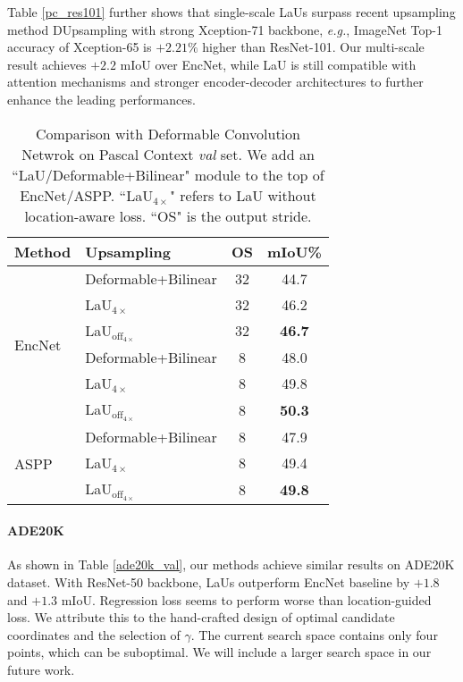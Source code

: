 \documentclass[10pt,twocolumn,letterpaper]{article}
\begin{document}
Table \ref{pc_res101} further shows that single-scale LaUs surpass recent upsampling method DUpsampling \cite{DUpsampling} with strong Xception-71 backbone, \textit{e.g.}, ImageNet Top-1 accuracy of Xception-65 is $+2.21\%$ higher than ResNet-101. Our multi-scale result achieves $+2.2$ mIoU over EncNet, while LaU is still compatible with attention mechanisms and stronger encoder-decoder architectures to further enhance the leading performances.
\begin{table}
  \caption{Comparison with Deformable Convolution Netwrok \cite{DaiQXLZHW17} on Pascal Context \textit{val} set. We add an ``LaU/Deformable+Bilinear" module to the top of EncNet/ASPP. ``LaU$_{4\times}$" refers to LaU without location-aware loss. ``OS" is the output stride.}
  \centering
\begin{tabular}{l|lcc}
\hline    
Method    & Upsampling & OS   & mIoU\%\\
\hline  \hline  
    \multirow{6}{*}{EncNet \cite{EncNet}}  & Deformable+Bilinear & 32  & 44.7 \\
    & LaU$_{4\times}$ & 32 & 46.2 \\
    & LaU$_{\text{off}_{4\times}}$ & 32 & \textbf{46.7} \\
\cline{2-4}  
& Deformable+Bilinear & 8  & 48.0  \\
& LaU$_{4\times}$ & 8 & 49.8 \\
    & LaU$_{\text{off}_{4\times}}$ & 8 & \textbf{50.3} \\
\hline
\multirow{3}{*}{ASPP \cite{ASPP}}  & Deformable+Bilinear & 8  & 47.9 \\
& LaU$_{4\times}$ & 8 & 49.4 \\
    & LaU$_{\text{off}_{4\times}}$ & 8 & \textbf{49.8} \\
\hline  
  \end{tabular}
\label{deformable}
\end{table}
\paragraph{ADE20K} As shown in Table \ref{ade20k_val}, our methods achieve similar results on ADE20K dataset. With ResNet-50 backbone, LaUs outperform EncNet baseline by $+1.8$ and $+1.3$ mIoU. Regression loss seems to perform worse than location-guided loss. We attribute this to the hand-crafted design of optimal candidate coordinates and the selection of $\gamma$. The current search space contains only four points, which can be suboptimal. We will include a larger search space in our future work.
\end{document}
